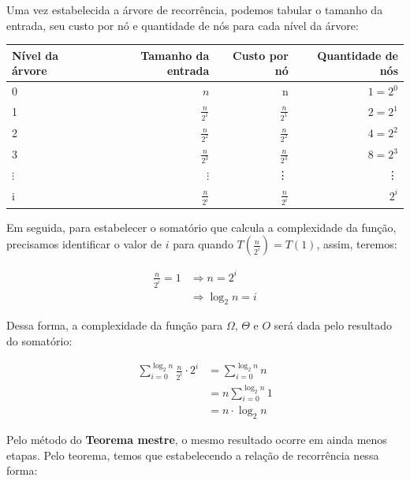 Uma vez estabelecida a árvore de recorrência, podemos tabular o tamanho da entrada, seu custo por nó e quantidade de nós para cada nível da árvore:


\begin{table}[h!]
	\centering
	\begin{tabular}{lrrr}
		\toprule
		Nível da árvore & Tamanho da entrada & Custo por nó    & Quantidade de nós \\
		\midrule
		0               & $n$                & n               & $1 = 2^0$         \\
		1               & $\frac{n}{2^1}$    & $\frac{n}{2^1}$ & $2 = 2^1$         \\
		2               & $\frac{n}{2^2}$    & $\frac{n}{2^2}$ & $4 = 2^2$         \\
		3               & $\frac{n}{2^3}$    & $\frac{n}{2^3}$ & $8 = 2^3$         \\
		$\vdots$        & $\vdots$           & \vdots          & \vdots            \\
		i               & $\frac{n}{2^i}$    & $\frac{n}{2^i}$ & $2^i$             \\
		\bottomrule
	\end{tabular}
\end{table}
\FloatBarrier

Em seguida, para estabelecer o somatório que calcula a complexidade da função, precisamos identificar o valor de $i$ para quando $T(\frac{n}{2^i}) = T(1)$, assim, teremos:

\begin{align*}
	\frac{n}{2^i} = 1 & \Longrightarrow n = 2^i      \\
	                  & \Longrightarrow \log_2 n = i
\end{align*}

Dessa forma, a complexidade da função para $\Omega$, $\Theta$ e $O$ será dada pelo resultado do somatório:

\begin{align*}
	\sum_{i = 0}^{\log_2 n} \frac{n}{2^i} \cdot 2^i & = \sum_{i = 0}^{\log_2 n}n  \\
	                                                & = n\sum_{i = 0}^{\log_2 n}1 \\
	                                                & = n \cdot \log_2 n
\end{align*}


Pelo método do \textbf{Teorema mestre}, o mesmo resultado ocorre em ainda menos etapas. Pelo teorema, temos que estabelecendo a relação de recorrência nessa forma:

